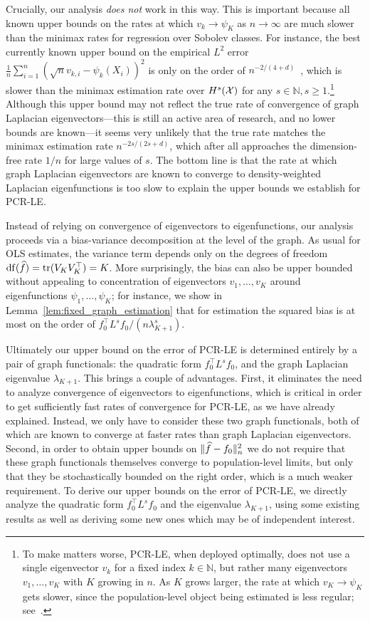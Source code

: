 Crucially, our analysis \emph{does not} work in this way. This is important because all known upper bounds on the rates at which $v_k \to \psi_K$ as $n \to \infty$ are much slower than the minimax rates for regression over Sobolev classes. For instance, the best currently known upper bound on the empirical $L^2$ error $\frac{1}{n}\sum_{i = 1}^{n}(\sqrt{n} v_{k,i} - \psi_k(X_i))^2$ is only on the order of $n^{-2/(4 + d)}$~\cite{cheng2021}, which is slower than the minimax estimation rate over $H^s(\mathcal{X})$ for any $s \in \mathbb{N}, s \geq 1$.\footnote{To make matters worse, PCR-LE, when deployed optimally, does not use a single eigenvector $v_k$ for a fixed index $k \in \mathbb{N}$, but rather many eigenvectors $v_1,\ldots,v_K$ with $K$ growing in $n$. As $K$ grows larger, the rate at which $v_K \to \psi_K$ gets slower, since the population-level object being estimated is less regular; see~\citep{burago2014,trillos2019}.} Although this upper bound may not reflect the true rate of convergence of graph Laplacian eigenvectors---this is still an active area of research, and no lower bounds are known---it seems very unlikely that the true rate matches the minimax estimation rate $n^{-2s/(2s + d)}$, which after all approaches the dimension-free rate $1/n$ for large values of $s$. The bottom line is that the rate at which graph Laplacian eigenvectors are known to converge to density-weighted Laplacian eigenfunctions is too slow to explain the upper bounds we establish for PCR-LE.

Instead of relying on convergence of eigenvectors to eigenfunctions, our analysis proceeds via a bias-variance decomposition at the level of the graph. As usual for OLS estimates, the variance term depends only on the degrees of freedom $\mathrm{df}(\widehat{f}) = \mathrm{tr}(V_KV_K^{\top}) = K$. More surprisingly, the bias can also be upper bounded without appealing to concentration of eigenvectors $v_1,\ldots,v_K$ around eigenfunctions $\psi_1,\ldots,\psi_K$; for instance, we show in Lemma~\ref{lem:fixed_graph_estimation} that for estimation the squared bias is at most on the order of $f_0^{\top} L^s f_0/(n\lambda_{K + 1}^s)$. 

Ultimately our upper bound on the error of PCR-LE is determined entirely by a pair of graph functionals: the quadratic form $f_0^{\top}L^s f_0$, and the graph Laplacian eigenvalue $\lambda_{K + 1}$. This brings a couple of advantages. First, it eliminates the need to analyze convergence of eigenvectors to eigenfunctions, which is critical in order to get sufficiently fast rates of convergence for PCR-LE, as we have already explained. Instead, we only have to consider these two graph functionals, both of which are known to converge at faster rates than graph Laplacian eigenvectors. Second, in order to obtain upper bounds on $\|\widehat{f} - f_0\|_n^2$ we do not require that these graph functionals themselves converge to population-level limits, but only that they be stochastically bounded on the right order, which is a much weaker requirement. To derive our upper bounds on the error of PCR-LE, we directly analyze the quadratic form $f_0^{\top}L^s f_0$ and the eigenvalue $\lambda_{K + 1}$, using some existing results as well as deriving some new ones which may be of independent interest.

